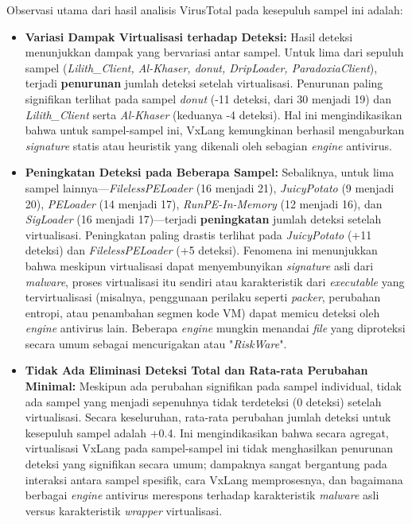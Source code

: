 Observasi utama dari hasil analisis VirusTotal pada kesepuluh sampel ini adalah:
\begin{itemize}
    \item \textbf{Variasi Dampak Virtualisasi terhadap Deteksi:} Hasil deteksi menunjukkan dampak yang bervariasi antar sampel. Untuk lima dari sepuluh sampel (\textit{Lilith\_Client, Al-Khaser, donut, DripLoader, ParadoxiaClient}), terjadi \textbf{penurunan} jumlah deteksi setelah virtualisasi. Penurunan paling signifikan terlihat pada sampel \textit{donut} (-11 deteksi, dari 30 menjadi 19) dan \textit{Lilith\_Client} serta \textit{Al-Khaser} (keduanya -4 deteksi). Hal ini mengindikasikan bahwa untuk sampel-sampel ini, VxLang kemungkinan berhasil mengaburkan \textit{signature} statis atau heuristik yang dikenali oleh sebagian \textit{engine} antivirus.

    \item \textbf{Peningkatan Deteksi pada Beberapa Sampel:} Sebaliknya, untuk lima sampel lainnya—\textit{FilelessPELoader} (16 menjadi 21), \textit{JuicyPotato} (9 menjadi 20), \textit{PELoader} (14 menjadi 17), \textit{RunPE-In-Memory} (12 menjadi 16), dan \textit{SigLoader} (16 menjadi 17)—terjadi \textbf{peningkatan} jumlah deteksi setelah virtualisasi. Peningkatan paling drastis terlihat pada \textit{JuicyPotato} (+11 deteksi) dan \textit{FilelessPELoader} (+5 deteksi). Fenomena ini menunjukkan bahwa meskipun virtualisasi dapat menyembunyikan \textit{signature} asli dari \textit{malware}, proses virtualisasi itu sendiri atau karakteristik dari \textit{executable} yang tervirtualisasi (misalnya, penggunaan perilaku seperti \textit{packer}, perubahan entropi, atau penambahan segmen kode VM) dapat memicu deteksi oleh \textit{engine} antivirus lain. Beberapa \textit{engine} mungkin menandai \textit{file} yang diproteksi secara umum sebagai mencurigakan atau "\textit{RiskWare}".

    \item \textbf{Tidak Ada Eliminasi Deteksi Total dan Rata-rata Perubahan Minimal:} Meskipun ada perubahan signifikan pada sampel individual, tidak ada sampel yang menjadi sepenuhnya tidak terdeteksi (0 deteksi) setelah virtualisasi. Secara keseluruhan, rata-rata perubahan jumlah deteksi untuk kesepuluh sampel adalah +0.4. Ini mengindikasikan bahwa secara agregat, virtualisasi VxLang pada sampel-sampel ini tidak menghasilkan penurunan deteksi yang signifikan secara umum; dampaknya sangat bergantung pada interaksi antara sampel spesifik, cara VxLang memprosesnya, dan bagaimana berbagai \textit{engine} antivirus merespons terhadap karakteristik \textit{malware} asli versus karakteristik \textit{wrapper} virtualisasi.


\end{itemize}
